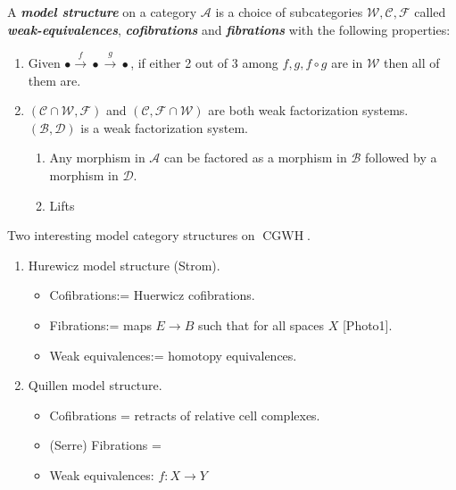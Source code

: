 \documentclass{article}
\numberwithin{equation}{section}
\newcommand{\Ac}{\mathcal{A}}
\newcommand{\Bc}{\mathcal{B}}
\newcommand{\Cc}{\mathcal{C}}
\newcommand{\Dc}{\mathcal{D}}
\newcommand{\Fc}{\mathcal{F}}
\newcommand{\Wc}{\mathcal{W}}
\DeclareMathOperator{\CGWH}{CGWH}
\begin{document}
\begin{defn}[Lecture]
A \textbf{\textit{model structure}} on a category $\Ac$ is a choice of subcategories $\Wc,\Cc,\Fc$ called \textbf{\textit{weak-equivalences}}, \textbf{\textit{cofibrations}} and \textbf{\textit{fibrations}} with the following properties:
\begin{enumerate}
	\item Given $\bullet\overset{f}{\to}\bullet\overset{g}{\to}\bullet$, if either 2 out of 3 among $f,g,f\circ g$ are in $\Wc$ then all of them are.
	\item $(\Cc\cap\Wc,\Fc)$ and $(\Cc,\Fc\cap\Wc)$ are both weak factorization systems.
	$(\Bc,\Dc)$ is a weak factorization system.
	\begin{enumerate}
		\item Any morphism in $\Ac$ can be factored as a morphism in $\Bc$ followed by a morphism in $\Dc$.
		\item {}
		{\color{orange} Lifts}
	\end{enumerate}
\end{enumerate}
\end{defn}
Two interesting model category structures on $\CGWH$.
\begin{enumerate}
\item Hurewicz model structure (Strom).
\begin{itemize}
	\item Cofibrations:= Huerwicz cofibrations.
	\item Fibrations:= maps $E\to B$ such that for all spaces $X$ [Photo1].
	\item Weak equivalences:= homotopy equivalences.
\end{itemize}
\item Quillen model structure.
\begin{itemize}
	\item Cofibrations = retracts of relative cell complexes.
	\item (Serre) Fibrations = 
	\item Weak equivalences: $f:X\to Y$
\end{itemize}
\end{enumerate}
\end{document}
